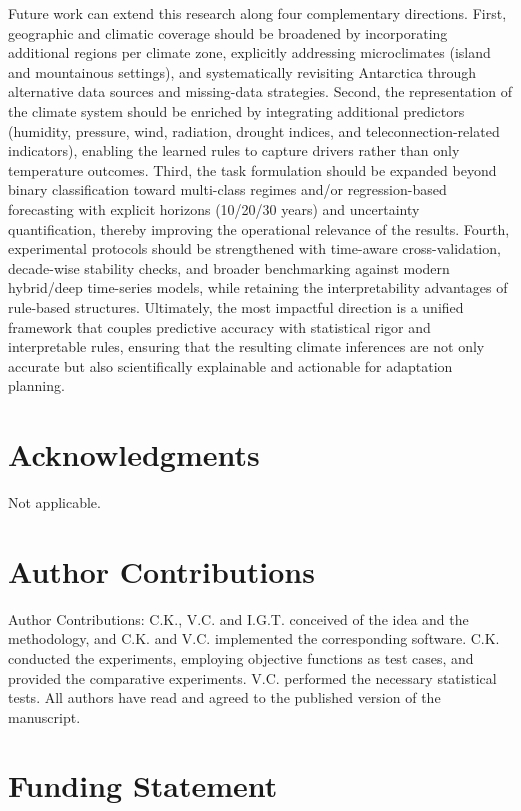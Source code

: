 \documentclass[12pt]{Definitions/academia}
\begin{document}
Future work can extend this research along four complementary directions.
First, geographic and climatic coverage should be broadened by incorporating
additional regions per climate zone, explicitly addressing microclimates
(island and mountainous settings), and systematically revisiting Antarctica
through alternative data sources and missing-data strategies. Second,
the representation of the climate system should be enriched by integrating
additional predictors (humidity, pressure, wind, radiation, drought
indices, and teleconnection-related indicators), enabling the learned
rules to capture drivers rather than only temperature outcomes. Third,
the task formulation should be expanded beyond binary classification
toward multi-class regimes and/or regression-based forecasting with
explicit horizons (10/20/30 years) and uncertainty quantification,
thereby improving the operational relevance of the results. Fourth,
experimental protocols should be strengthened with time-aware cross-validation,
decade-wise stability checks, and broader benchmarking against modern
hybrid/deep time-series models, while retaining the interpretability
advantages of rule-based structures. Ultimately, the most impactful
direction is a unified framework that couples predictive accuracy
with statistical rigor and interpretable rules, ensuring that the
resulting climate inferences are not only accurate but also scientifically
explainable and actionable for adaptation planning.



\section*{Acknowledgments}

Not applicable.

\section*{Author Contributions}

Author Contributions:  C.K., V.C. and I.G.T. conceived of the idea and the methodology, and C.K. and V.C. implemented the corresponding software. C.K. conducted the experiments, employing objective functions as test cases, and provided the comparative experiments. V.C. performed the necessary statistical tests. All authors have read and agreed to the published version of the manuscript.


\section*{Funding Statement}
\end{document}
